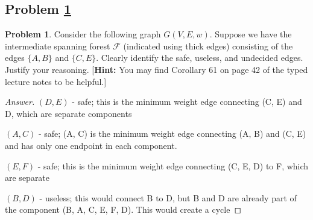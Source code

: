 \documentclass[11pt]{article}
\theoremstyle{definition}
\theoremstyle{definition}
\newtheorem{required}{Problem}
\theoremstyle{definition}
\begin{document}
\subsection{Problem \ref{Safe2}}
\begin{required} \label{Safe2}
Consider the following graph $G(V, E, w)$. Suppose we have the intermediate spanning forest $\mathcal{F}$ (indicated using thick edges) consisting of the edges $\{A, B\}$ and $\{C, E\}$. Clearly identify the safe, useless, and undecided edges. Justify your reasoning. [\textbf{Hint:} You may find Corollary 61 on page 42 of the typed lecture notes to be helpful.]
\begin{center}
\end{center}
\end{required}


\begin{proof}[Answer]
$(D, E)$ - safe; this is the minimum weight edge connecting (C, E) and D, which are separate components

$(A, C)$ - safe; (A, C) is the minimum weight edge connecting (A, B) and (C, E) and has only one endpoint in each component.

$(E, F)$ - safe; this is the minimum weight edge connecting (C, E, D) to F, which are separate

$(B, D)$ - useless; this would connect B to D, but B and D are already part of the component (B, A, C, E, F, D). This would create a cycle 

\end{proof}
\end{document}
